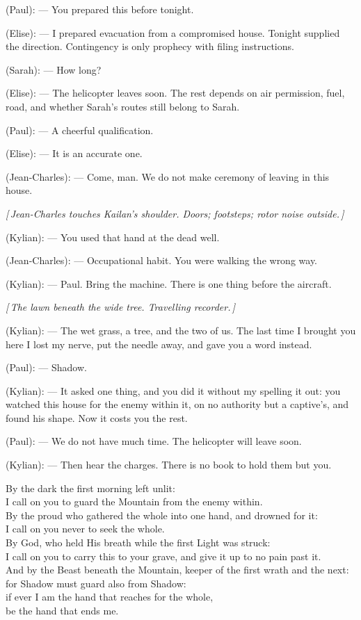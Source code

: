 \begin{room}
(Paul): --- You prepared this before tonight.

(Elise): --- I prepared evacuation from a compromised house. Tonight supplied the direction. Contingency is only prophecy with filing instructions.

(Sarah): --- How long?

(Elise): --- The helicopter leaves soon. The rest depends on air permission, fuel, road, and whether Sarah's routes still belong to Sarah.

(Paul): --- A cheerful qualification.

(Elise): --- It is an accurate one.

(Jean-Charles): --- Come, man. We do not make ceremony of leaving in this house.

\centerline{\textit{[\,Jean-Charles touches Kailan's shoulder. Doors; footsteps; rotor noise outside.\,]}}

(Kylian): --- You used that hand at the dead well.

(Jean-Charles): --- Occupational habit. You were walking the wrong way.

(Kylian): --- Paul. Bring the machine. There is one thing before the aircraft.

\centerline{\textit{[\,The lawn beneath the wide tree. Travelling recorder.\,]}}

(Kylian): --- The wet grass, a tree, and the two of us. The last time I brought you here I lost my nerve, put the needle away, and gave you a word instead.

(Paul): --- Shadow.

(Kylian): --- It asked one thing, and you did it without my spelling it out: you watched this house for the enemy within it, on no authority but a captive's, and found his shape. Now it costs you the rest.

(Paul): --- We do not have much time. The helicopter will leave soon.

(Kylian): --- Then hear the charges. There is no book to hold them but you.

\begin{scripture}
By the dark the first morning left unlit: \\
I call on you to guard the Mountain from the enemy within. \\
By the proud who gathered the whole into one hand, and drowned for it: \\
I call on you never to seek the whole. \\
By God, who held His breath while the first Light was struck: \\
I call on you to carry this to your grave, and give it up to no pain past it. \\
And by the Beast beneath the Mountain, keeper of the first wrath and the next: \\
for Shadow must guard also from Shadow: \\
if ever I am the hand that reaches for the whole, \\
be the hand that ends me.
\end{scripture}


\end{room}
